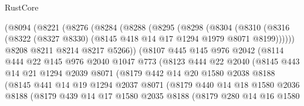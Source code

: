 \begin{lexlean}{RustCore}
\begin{coremodule}
            (@8094
              (@8221
                (@8276
                  (@8284
                    (@8288
                      (@8295
                        (@8298
                          (@8304
                            (@8310
                              (@8316
                                (@8322
                                  (@8327 @8330)
                                  (@8145 @418 @14 @17 @1294 @1979 @8071 @8199))))))
                        @8208
                        @8211
                        @8214
                        @8217
                        @5266))
                    (@8107
                      @445
                      @145
                      @976
                      @2042
                      (@8114
                        @444
                        @22
                        @145
                        @976
                        @2040
                        @1047
                        @773
                        (@8123
                          @444
                          @22
                          @2040
                          (@8145
                            @443
                            @14
                            @21
                            @1294
                            @2039
                            @8071
                            (@8179
                              @442
                              @14
                              @20
                              @1580
                              @2038
                              @8188
                              (@8145
                                @441
                                @14
                                @19
                                @1294
                                @2037
                                @8071
                                (@8179
                                  @440
                                  @14
                                  @18
                                  @1580
                                  @2036
                                  @8188
                                  (@8179
                                    @439
                                    @14
                                    @17
                                    @1580
                                    @2035
                                    @8188
                                    (@8179
                                      @280
                                      @14
                                      @16
                                      @1580

\end{coremodule}
\end{lexlean}
